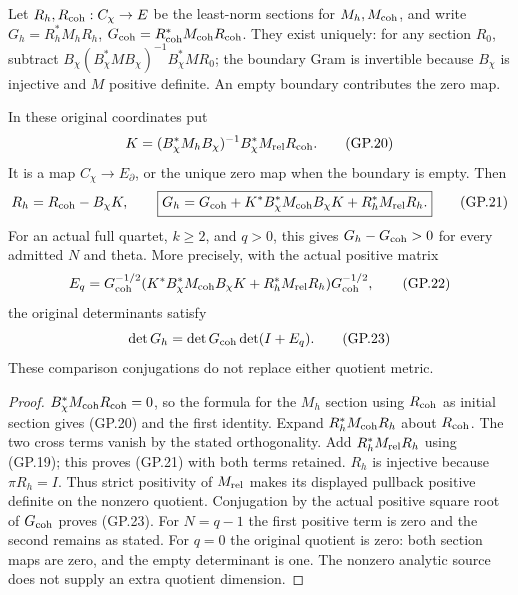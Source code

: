 Let $R_h,R_{\rm coh}:C_\chi\to E$ be the least-norm sections for
$M_h,M_{\rm coh}$, and write $G_h=R_h^*M_hR_h$,
$G_{\rm coh}=R_{\rm coh}^*M_{\rm coh}R_{\rm coh}$. They exist uniquely:
for any section $R_0$, subtract
$B_\chi(B_\chi^*MB_\chi)^{-1}B_\chi^*MR_0$; the boundary Gram
is invertible because $B_\chi$ is injective and $M$ positive definite.
An empty boundary contributes the zero map.
\begin{theorem}
In these original coordinates put
\begin{equation}
 K=(B_\chi^*M_hB_\chi)^{-1}B_\chi^*M_{\rm rel}R_{\rm coh}.
 \tag{GP.20}
\end{equation}
It is a map $C_\chi\to E_\partial$, or the unique zero map when
the boundary is empty. Then
\begin{equation}
 R_h=R_{\rm coh}-B_\chi K,\qquad
 \boxed{G_h=G_{\rm coh}
       +K^*B_\chi^*M_{\rm coh}B_\chi K
       +R_h^*M_{\rm rel}R_h.}
 \tag{GP.21}
\end{equation}
For an actual full quartet, $k\geq2$, and $q>0$, this gives
$G_h-G_{\rm coh}>0$ for every admitted $N$ and theta. More precisely,
with the actual positive matrix
\begin{equation}
 E_q=G_{\rm coh}^{-1/2}
 (K^*B_\chi^*M_{\rm coh}B_\chi K+R_h^*M_{\rm rel}R_h)
 G_{\rm coh}^{-1/2},
 \tag{GP.22}
\end{equation}
the original determinants satisfy
\begin{equation}
 \det G_h=\det G_{\rm coh}\det(I+E_q).
 \tag{GP.23}
\end{equation}
These comparison conjugations do not replace either quotient metric.
\end{theorem}
\begin{proof}
$B_\chi^*M_{\rm coh}R_{\rm coh}=0$, so the formula for the
$M_h$ section using $R_{\rm coh}$ as initial section gives (GP.20)
and the first identity. Expand
$R_h^*M_{\rm coh}R_h$ about $R_{\rm coh}$. The two cross terms
vanish by the stated orthogonality. Add $R_h^*M_{\rm rel}R_h$
using (GP.19); this proves (GP.21) with both terms retained.
$R_h$ is injective because $\pi R_h=I$. Thus strict positivity
of $M_{\rm rel}$ makes its displayed pullback positive definite
on the nonzero quotient. Conjugation by the actual positive square
root of $G_{\rm coh}$ proves (GP.23). For $N=q-1$ the first
positive term is zero and the second remains as stated. For $q=0$
the original quotient is zero: both section maps are zero, and the
empty determinant is one. The nonzero analytic source does not
supply an extra quotient dimension.
\end{proof}

